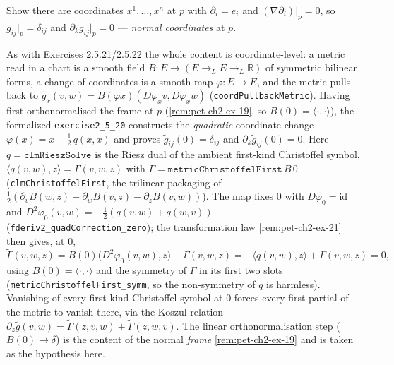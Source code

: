 \begin{remark}
  \label{rem:pet-ch2-ex-20}
  \leanok
  Show there are coordinates $x^1,\dots,x^n$ at $p$ with $\partial_i=e_i$ and
  $(\nabla\partial_i)|_p=0$, so $g_{ij}|_p=\delta_{ij}$ and
  $\partial_kg_{ij}|_p=0$ — \emph{normal coordinates} at $p$.

  As with Exercises 2.5.21/2.5.22 the whole content is coordinate-level: a metric
  read in a chart is a smooth field $B:E\to(E\to_L E\to_L\mathbb{R})$ of symmetric
  bilinear forms, a change of coordinates is a smooth map $\varphi:E\to E$, and
  the metric pulls back to $\tilde g_x(v,w)=B(\varphi x)(D\varphi_x v,D\varphi_x w)$
  (\texttt{coordPullbackMetric}). Having first orthonormalised the frame at $p$
  (\cref{rem:pet-ch2-ex-19}, so $B(0)=\langle\cdot,\cdot\rangle$), the formalized
  \texttt{exercise2\_5\_20} constructs the \emph{quadratic} coordinate change
  $\varphi(x)=x-\tfrac12\,q(x,x)$ and proves $\tilde g_{ij}(0)=\delta_{ij}$ and
  $\partial_k\tilde g_{ij}(0)=0$. Here $q=\texttt{clmRieszSolve}$ is the Riesz dual
  of the ambient first-kind Christoffel symbol,
  $\langle q(v,w),z\rangle=\Gamma(v,w,z)$ with $\Gamma=\texttt{metricChristoffelFirst}\,B\,0$
  (\texttt{clmChristoffelFirst}, the trilinear packaging of $\tfrac12(\partial_v
  B(w,z)+\partial_w B(v,z)-\partial_z B(v,w))$). The map fixes $0$ with
  $D\varphi_0=\mathrm{id}$ and $D^2\varphi_0(v,w)=-\tfrac12(q(v,w)+q(w,v))$
  (\texttt{fderiv2\_quadCorrection\_zero}); the transformation law
  \cref{rem:pet-ch2-ex-21} then gives, at $0$,
  \[
    \tilde\Gamma(v,w,z)=B(0)\!\big(D^2\varphi_0(v,w),z\big)+\Gamma(v,w,z)
      =-\langle q(v,w),z\rangle+\Gamma(v,w,z)=0,
  \]
  using $B(0)=\langle\cdot,\cdot\rangle$ and the symmetry of $\Gamma$ in its first
  two slots (\texttt{metricChristoffelFirst\_symm}, so the non-symmetry of $q$ is
  harmless). Vanishing of every first-kind Christoffel symbol at $0$ forces every
  first partial of the metric to vanish there, via the Koszul relation
  $\partial_z\tilde g(v,w)=\tilde\Gamma(z,v,w)+\tilde\Gamma(z,w,v)$. The linear
  orthonormalisation step ($B(0)\to\delta$) is the content of the normal
  \emph{frame} \cref{rem:pet-ch2-ex-19} and is taken as the hypothesis here.
\end{remark}

